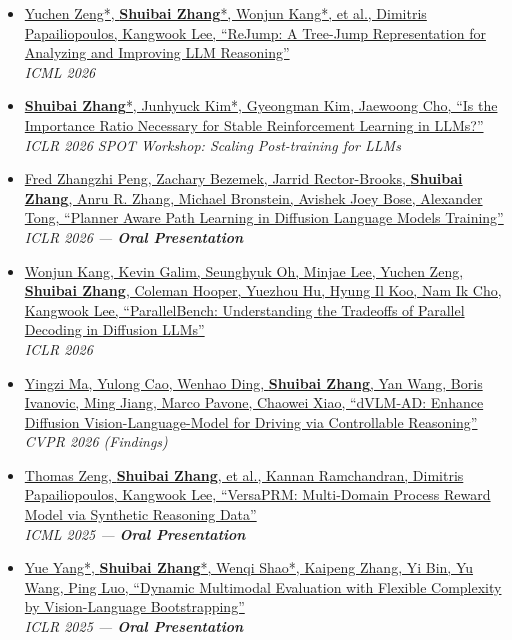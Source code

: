 \documentclass[a4paper,11pt]{article}
\begin{document}
{\begin{itemize}[leftmargin=*,itemsep=4pt]
\item \href{https://www.arxiv.org/pdf/2512.00831}{
Yuchen Zeng*, \textbf{Shuibai Zhang}*, Wonjun Kang*, et al., Dimitris Papailiopoulos, Kangwook Lee,
``ReJump: A Tree-Jump Representation for Analyzing and Improving LLM Reasoning''} \\
\hfill \textit{ICML 2026}

\item \href{https://openreview.net/forum?id=eiOwyAa2O1}{
\textbf{Shuibai Zhang}*, Junhyuck Kim*, Gyeongman Kim, Jaewoong Cho,
``Is the Importance Ratio Necessary for Stable Reinforcement Learning in LLMs?''} \\
\hfill \textit{ICLR 2026 SPOT Workshop: Scaling Post-training for LLMs}

\item \href{https://www.arxiv.org/pdf/2509.23405}{
Fred Zhangzhi Peng, Zachary Bezemek, Jarrid Rector-Brooks, \textbf{Shuibai Zhang}, Anru R. Zhang, Michael Bronstein, Avishek Joey Bose, Alexander Tong,
``Planner Aware Path Learning in Diffusion Language Models Training''} \\
\hfill \textit{ICLR 2026 --- \textbf{Oral Presentation}}

\item \href{https://arxiv.org/pdf/2510.04767}{
Wonjun Kang, Kevin Galim, Seunghyuk Oh, Minjae Lee, Yuchen Zeng, \textbf{Shuibai Zhang}, Coleman Hooper, Yuezhou Hu, Hyung Il Koo, Nam Ik Cho, Kangwook Lee,
``ParallelBench: Understanding the Tradeoffs of Parallel Decoding in Diffusion LLMs''} \\
\hfill \textit{ICLR 2026}

\item \href{https://arxiv.org/pdf/2512.04459v1}{
Yingzi Ma, Yulong Cao, Wenhao Ding, \textbf{Shuibai Zhang}, Yan Wang, Boris Ivanovic, Ming Jiang, Marco Pavone, Chaowei Xiao,
``dVLM-AD: Enhance Diffusion Vision-Language-Model for Driving via Controllable Reasoning''} \\
\hfill \textit{CVPR 2026 (Findings)}

\item \href{https://arxiv.org/pdf/2502.06737}{
Thomas Zeng, \textbf{Shuibai Zhang}, et al., Kannan Ramchandran, Dimitris Papailiopoulos, Kangwook Lee,
``VersaPRM: Multi-Domain Process Reward Model via Synthetic Reasoning Data''} \\
\hfill \textit{ICML 2025 --- \textbf{Oral Presentation}}

\item \href{https://arxiv.org/pdf/2410.08695}{
Yue Yang*, \textbf{Shuibai Zhang}*, Wenqi Shao*, Kaipeng Zhang, Yi Bin, Yu Wang, Ping Luo,
``Dynamic Multimodal Evaluation with Flexible Complexity by Vision-Language Bootstrapping''} \\
\hfill \textit{ICLR 2025 --- \textbf{Oral Presentation}}


\end{itemize}}
\end{document}
